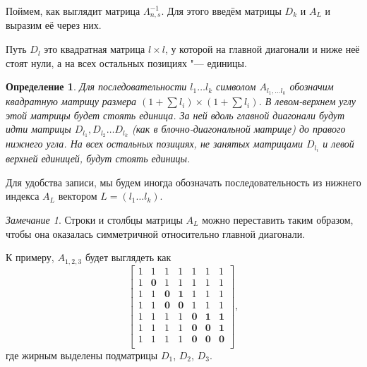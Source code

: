 \documentclass[oneside, a4paper]{article}
\theoremstyle{plain}
\newtheorem{definition}{Определение}
\theoremstyle{remark}
\newtheorem{remark}{Замечание}
\begin{document}
Поймем, как выглядит матрица $\Lambda_{n, s}^{-1}$. Для этого введём матрицы
$D_k$ и $A_L$ и выразим её через них.

Путь $D_l$ это квадратная матрица $l \times l$, у которой на главной диагонали и
ниже неё стоят нули, а на всех остальных позициях "--- единицы.

\begin{definition}
Для последовательности $l_1 \dots l_k$ символом $A_{l_1, \dots l_k}$ обозначим
квадратную матрицу размера $(1 + \sum l_i) \times (1 + \sum l_i)$. В левом-верхнем
углу этой матрицы будет стоять единица. За ней вдоль главной диагонали будут идти
матрицы $D_{l_1}, D_{l_2} \dots D_{l_k}$ (как в блочно-диагональной матрице) до
правого нижнего угла. На всех остальных позициях, не занятых матрицами $D_{l_i}$
и левой верхней единицей, будут стоять единицы.
\end{definition}

Для удобства записи, мы будем иногда обозначать последовательность из нижнего
индекса $A_L$ вектором $L = (l_1 \dots l_k)$.

\begin{remark}
Строки и столбцы матрицы $A_L$ можно переставить таким образом, чтобы она
оказалась симметричной относительно главной диагонали.
\end{remark}

К примеру, $A_{1, 2, 3}$ будет выглядеть как
\[
\begin{bmatrix}
1 & 1 & 1 & 1 & 1 & 1 & 1 \\
1 & \mathbf{0} & 1 & 1 & 1 & 1 & 1 \\
1 & 1 & \mathbf{0} & \mathbf{1} & 1 & 1 & 1 \\
1 & 1 & \mathbf{0} & \mathbf{0} & 1 & 1 & 1 \\
1 & 1 & 1 & 1 & \mathbf{0} & \mathbf{1} & \mathbf{1} \\
1 & 1 & 1 & 1 & \mathbf{0} & \mathbf{0} & \mathbf{1} \\
1 & 1 & 1 & 1 & \mathbf{0} & \mathbf{0} & \mathbf{0} \\
\end{bmatrix},
\]
где жирным выделены подматрицы $D_1$, $D_2$, $D_3$.
\end{document}
